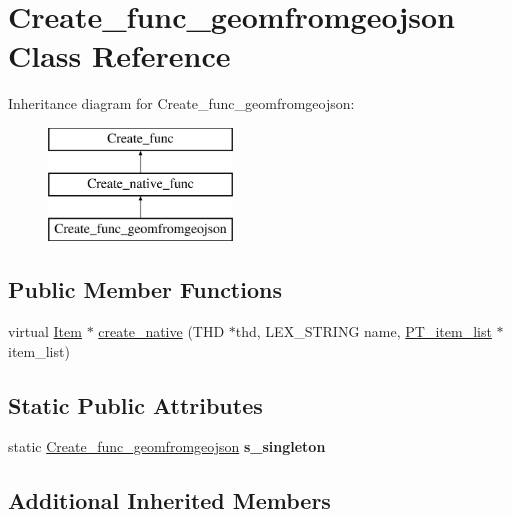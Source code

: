 \hypertarget{classCreate__func__geomfromgeojson}{}\section{Create\+\_\+func\+\_\+geomfromgeojson Class Reference}
\label{classCreate__func__geomfromgeojson}
Inheritance diagram for Create\+\_\+func\+\_\+geomfromgeojson\+:\begin{figure}[H]
\begin{center}
\leavevmode
\includegraphics[height=3.000000cm]{classCreate__func__geomfromgeojson}
\end{center}
\end{figure}
\subsection*{Public Member Functions}
\begin{DoxyCompactItemize}
\item 
virtual \mbox{\hyperlink{classItem}{Item}} $\ast$ \mbox{\hyperlink{classCreate__func__geomfromgeojson_a1c72f63838d7c6d2c54ffbcc8323e113}{create\+\_\+native}} (T\+HD $\ast$thd, L\+E\+X\+\_\+\+S\+T\+R\+I\+NG name, \mbox{\hyperlink{classPT__item__list}{P\+T\+\_\+item\+\_\+list}} $\ast$item\+\_\+list)
\end{DoxyCompactItemize}
\subsection*{Static Public Attributes}
\begin{DoxyCompactItemize}
\item 
\mbox{\label{classCreate__func__geomfromgeojson_a9ce3b9b9c7d4716b8785e5bbf56baea3}} 
static \mbox{\hyperlink{classCreate__func__geomfromgeojson}{Create\+\_\+func\+\_\+geomfromgeojson}} {\bfseries s\+\_\+singleton}
\end{DoxyCompactItemize}
\subsection*{Additional Inherited Members}


